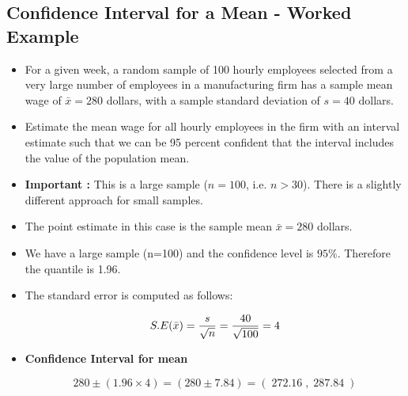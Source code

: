 
\subsection{Confidence Interval for a Mean - Worked Example }

\begin{itemize}
\item For a given week, a random sample of 100 hourly employees selected from a very large number of
employees in a manufacturing firm has a sample mean wage of $\bar{x} = 280$ dollars, with a sample standard deviation of
$s = 40$ dollars.
\item Estimate the mean wage for all hourly employees in the firm with an interval estimate such that we can be 95
percent confident that the interval includes the value of the population mean.
\item \textbf{Important :} This is a large sample ($n= 100$, i.e. $n >30$). There is a slightly different approach for small samples.
\end{itemize}




\begin{itemize}
\item The point estimate in this case is the sample mean $\bar{x} = 280$ dollars.
\item We have a large sample (n=100) and the confidence level is $95\%$. Therefore the quantile  is 1.96.
\item The standard error is computed as follows:

\[ S.E( \bar{x} )  = {s \over \sqrt{n}}  =  {40 \over \sqrt{100}} = 4  \]
\item \textbf{Confidence Interval for mean}

\[
280 \pm (1.96 \times 4)  = (280 \pm 7.84) = (\;272.16\;,\;287.84\;)
\]

\end{itemize}

